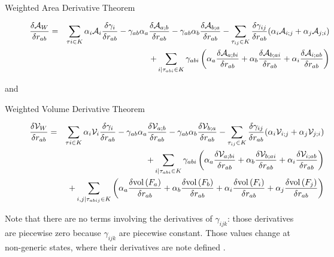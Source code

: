 \documentclass[11 pt]{article}
\newcommand {\mm}[1] {\ifmmode{#1}\else{\mbox{\(#1\)}}\fi}
\theoremstyle{plain} \theorembodyfont{\rmfamily}
\newcommand{\tsx}           {\mm{\tau}}
\newcommand{\Volume}[1]     {\mm{\rm vol\,}{#1}}
\begin{document}
\begin{description}
  \item[{\sc Weighted Area Derivative Theorem}]
    \begin{eqnarray}
    \frac{\delta \mathcal{A}_W}{\delta r_{ab}}  &=&\sum_{\tsx{i} \in K} \alpha_i \mathcal{A}_i \frac{\delta \gamma_i}{\delta r_{ab}}   - \gamma_{ab} \alpha_a \frac{\delta\mathcal{A}_{a;b}}{\delta r_{ab}} - \gamma_{ab} \alpha_b \frac{\delta \mathcal{A}_{b;a}}{\delta r_{ab}}  
    - \sum_{ \tsx_{ij} \in K} \frac{\delta \gamma_{ij}}{\delta  r_{ab}}  (\alpha_i \mathcal{A}_{i;j} + \alpha_j \mathcal{A}_{j;i}) \nonumber \\
  &&  + \sum_{i \mid \tsx_{abi} \in K} \gamma_{abi} \left(\alpha_a \frac{\delta \mathcal{A}_{a;bi}}{\delta r_{ab}} + \alpha_b \frac{\delta \mathcal{A}_{b;ai}}{\delta r_{ab}}+ \alpha_i \frac{\delta \mathcal{A}_{i;ab}}{\delta r_{ab}} \right) 
          \label{eqn:areaderiv}
          \end{eqnarray}
\end{description}
and
\begin{description}
  \item[{\sc Weighted Volume Derivative Theorem}]
    \begin{eqnarray}
    \frac{\delta \mathcal{V}_W}{\delta r_{ab}}  &=&    \sum_{\tsx{i} \in K} \alpha_i \mathcal{V}_i \frac{\delta \gamma_i}{\delta r_{ab}} - \gamma_{ab} \alpha_a \frac{\delta\mathcal{V}_{a;b}}{\delta r_{ab}} - \gamma_{ab} \alpha_b \frac{\delta \mathcal{V}_{b;a}}{\delta r_{ab}}  
    - \sum_{\tsx_{ij} \in K} \frac{\delta \gamma_{ij}}{\delta  r_{ab}}  (\alpha_i \mathcal{V}_{i;j} + \alpha_j \mathcal{V}_{j;i}) \nonumber \\
  &&  + \sum_{i \mid \tsx_{abi} \in K} \gamma_{abi} \left(\alpha_a \frac{\delta \mathcal{V}_{a;bi}}{\delta r_{ab}} + \alpha_b \frac{\delta \mathcal{V}_{b;ai}}{\delta r_{ab}}+ \alpha_i \frac{\delta \mathcal{V}_{i;ab}}{\delta r_{ab}} \right)   \nonumber \\
&&+  \sum_{i,j \mid \tsx_{abij} \in K} \left(\alpha_a \frac{\delta \Volume{(F_a)}}{\delta r_{ab}}    +  
\alpha_b \frac{\delta \Volume{(F_b)}}{\delta r_{ab}} + \alpha_i \frac{\delta \Volume{(F_i)}}{\delta r_{ab}} + \alpha_j \frac{\delta \Volume{(F_j)}}{\delta r_{ab}}  \right) \nonumber \\
  \label{eqn:volderiv}
          \end{eqnarray}
\end{description}
Note that there are no terms involving the derivatives of $\gamma_{ijk}$: those derivatives are piecewise zero because $\gamma_{ijk}$ are piecewise constant. Those values change at non-generic states, where their derivatives are note defined \cite{BEKL04, EdKo03, AkEd19a, AkEd19b}.
\end{document}
